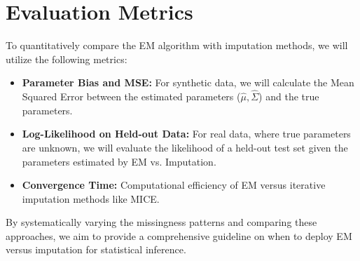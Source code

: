 \documentclass{article}
\begin{document}
\section{Evaluation Metrics}
To quantitatively compare the EM algorithm with imputation methods, we will utilize the following metrics:
\begin{itemize}
    \item \textbf{Parameter Bias and MSE:} For synthetic data, we will calculate the Mean Squared Error between the estimated parameters ($\hat{\mu}, \hat{\Sigma}$) and the true parameters.
    \item \textbf{Log-Likelihood on Held-out Data:} For real data, where true parameters are unknown, we will evaluate the likelihood of a held-out test set given the parameters estimated by EM vs. Imputation.
    \item \textbf{Convergence Time:} Computational efficiency of EM versus iterative imputation methods like MICE.
\end{itemize}

By systematically varying the missingness patterns and comparing these approaches, we aim to provide a comprehensive guideline on when to deploy EM versus imputation for statistical inference.
\end{document}
